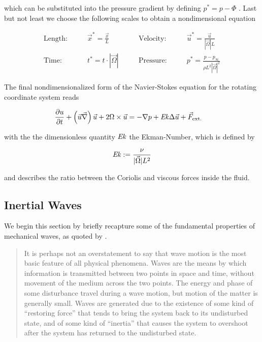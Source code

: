 which can be substituted into the pressure gradient by defining $p^* = p - \Phi$ \citep{tritton88}.
\newpage
Last but not least we choose the following scales to obtain a nondimensional equation

\begin{align}
    \text{Length:}\qquad &  \vec{x}^* = \frac{\vec{x}}{L}  &
    \qquad \text{Velocity:}\qquad& \vec{u}^* =  \frac{\vec{u}}{|\vec{\Omega}|L}\\
    \text{Time:}  \qquad & t^* = t \cdot |\vec{\Omega}| &
    \qquad  \text{Pressure:}\qquad & p^* = \frac{p - p_\infty}{\rho L^2{|\vec{\Omega}|}^2}
\end{align}

The final nondimensionalized form of the Navier-Stokes equation for the rotating coordinate system reads

\begin{align}
    \pdn[u]{t}+ \left(\vec{u}  \vec{\nabla}\right) \vec{u} + 2\Omega \times \vec{u}  &= -  \nabla p + \Ekman \Delta \vec{u} + \vec{F}_{\text{ext.}}
\end{align}

with the the dimensionless quantity $\Ekman$ the Ekman-Number, which is defined by

\begin{align}
    \Ekman := \frac{\nu}{|\vec{\Omega}| L^2}
\end{align}

and describes the ratio between the Coriolis and viscous forces inside the fluid.

\subsection{Inertial Waves}

We begin this section by briefly recapture some of the fundamental properties of mechanical waves, as quoted by \cite[p.194]{Kundu2012}.

\begin{quote}
It is perhaps not an overstatement to say that wave motion is the most basic feature
of all physical phenomena. Waves are the means by which information is transmitted
between two points in space and time, without movement of the medium across the
two points. The energy and phase of some disturbance travel during a wave motion,
but motion of the matter is generally small. Waves are generated due to the existence of
some kind of “restoring force” that tends to bring the system back to its undisturbed
state, and of some kind of “inertia” that causes the system to overshoot after the
system has returned to the undisturbed state.
\end{quote}

